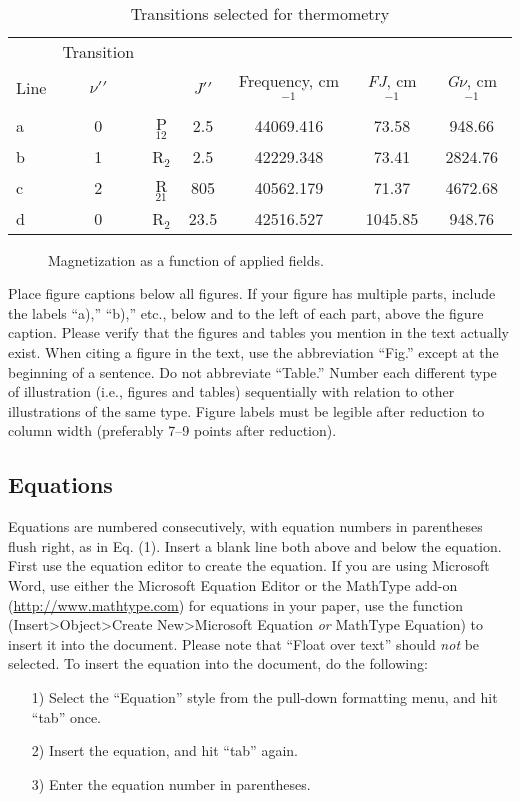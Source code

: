 \documentclass{AIAA}
\begin{document}
\begin{table}
\caption{\label{tab:table1} Transitions selected for thermometry}
\begin{ruledtabular}
\begin{tabular}{lcccccc}
& Transition& & \multicolumn{2}{c}{}\\\cline{2-2}
Line& $\nu \prime\prime $& & \textit{J}$\prime\prime $& Frequency, cm$^{-1}$& \textit{FJ}, cm$^{-1}$& \textit{G}$\nu $, cm$^{-1}$\\\hline
a& 0& P$_{12}$& 2.5& 44069.416& 73.58& 948.66\\
b& 1& R$_{2}$& 2.5& 42229.348& 73.41& 2824.76\\
c& 2& R$_{21}$& 805& 40562.179& 71.37& 4672.68\\
d& 0& R$_{2}$& 23.5& 42516.527& 1045.85& 948.76\\
\end{tabular}
\end{ruledtabular}
\end{table}


\begin{figure}
\caption{Magnetization as a function of applied fields.}
\end{figure}

Place figure captions below all figures. If your figure has multiple parts, include the labels ``a),'' ``b),'' etc., below and to the left of each part, above the figure caption. Please verify that the figures and tables you mention in the text actually exist. When citing a figure in the text, use the abbreviation ``Fig.'' except at the beginning of a sentence. Do not abbreviate ``Table.'' Number each different type of illustration (i.e., figures and tables) sequentially with relation to other illustrations of the same type.
Figure labels must be legible after reduction to column width (preferably 7--9 points after reduction).

\subsection{Equations}
Equations are numbered consecutively, with equation numbers in parentheses flush right, as in Eq. (1). Insert a blank line both above and below the equation. First use the equation editor to create the equation. If you are using Microsoft Word, use either the Microsoft Equation Editor or the MathType add-on (\url{http://www.mathtype.com}) for equations in your paper, use the function (Insert>Object>Create New>Microsoft Equation \textit{or} MathType Equation) to insert it into the document. Please note that ``Float over text'' should \textit{not} be selected. To insert the equation into the document, do the following:
\begin{enumerate}
\item[1)]  Select the ``Equation'' style from the pull-down formatting menu, and hit ``tab'' once.
\item[2)]  Insert the equation, and hit ``tab'' again.
\item[3)]  Enter the equation number in parentheses.
\end{enumerate}
\end{document}

